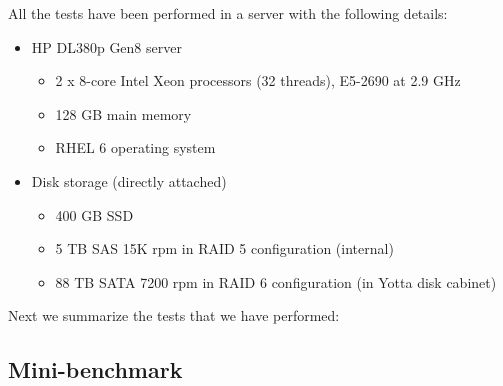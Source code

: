 \documentclass[a4paper,11pt]{article}
\begin{document}
All the tests have been performed in a server with the following details:
\begin{itemize}
	\item HP DL380p Gen8 server
	\begin{itemize}
		\item 2 x 8-core Intel Xeon processors (32 threads), E5-2690 at 2.9 GHz
		\item 128 GB main memory
		\item RHEL 6 operating system	
	\end{itemize}
	\item Disk storage (directly attached)
	\begin{itemize}
		\item 400 GB SSD
		\item 5 TB SAS 15K rpm in RAID 5 configuration (internal)
		\item 88 TB SATA 7200 rpm in RAID 6 configuration (in Yotta disk cabinet)
	\end{itemize}
\end{itemize}

Next we summarize the tests that we have performed:

\subsection{Mini-benchmark}
\end{document}

